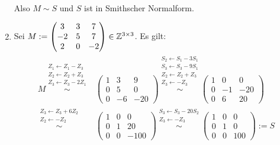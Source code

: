 \documentclass[../../main.tex]{subfiles}
\begin{document}
\begin{bsp}
\begin{enumerate}[\normalfont(a)]
\begin{align*}
        \end{align*}
        Also $M\sim S$ und $S$ ist in Smithscher Normalform.
        \item Sei $M:=\begin{pmatrix*}3 & 3 & 7\\ -2 & 5 & 7\\ 2 & 0 & -2\end{pmatrix*}\in \Z^{3\times 3}$. Es gilt:
        \begin{align*}
            M\stackrel{\begin{smallmatrix*}Z_1\leftarrow Z_1-Z_3\\Z_2\leftarrow Z_2+Z_3\\ Z_3\leftarrow Z_3-2Z_1\end{smallmatrix*}}{\sim}&\begin{pmatrix*}1 & 3 & 9\\ 0 & 5 & 0\\ 0 & -6 & -20\end{pmatrix*}\stackrel{\begin{smallmatrix*}S_2\leftarrow S_1-3S_1\\S_3\leftarrow S_3-9S_1\\ Z_2\leftarrow Z_2+Z_3\\ Z_3\leftarrow -Z_3\end{smallmatrix*}}{\sim}\begin{pmatrix*}1 & 0 & 0\\ 0 & -1 & -20\\ 0 & 6 & 20\end{pmatrix*}\\
            \stackrel{\begin{smallmatrix*}Z_3\leftarrow Z_3+6Z_2\\ Z_2\leftarrow -Z_2\end{smallmatrix*}}{\sim}&\begin{pmatrix*}1 & 0 & 0\\ 0 & 1 & 20\\ 0 & 0 & -100\end{pmatrix*}\stackrel{\begin{smallmatrix*}S_3\leftarrow S_3-20S_2\\ Z_3\leftarrow -Z_3\end{smallmatrix*}}{\sim}\begin{pmatrix*}1 & 0 & 0\\ 0 & 1 & 0\\ 0 & 0 & 100\end{pmatrix*}:=S
        \end{align*}

\end{enumerate}
\end{bsp}
\end{document}
